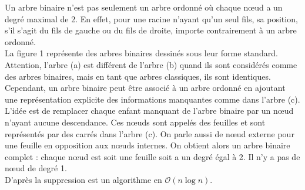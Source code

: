 \documentclass{report}
\begin{document}
Un arbre binaire n'est pas seulement un arbre ordonné où chaque nœud a un degré maximal de 2.  En effet, pour une racine n'ayant qu'un seul fils, sa position, s'il s'agit du fils de gauche ou du fils de droite, importe contrairement à un arbre ordonné.\\
La figure 1 représente des arbres binaires dessinés sous leur forme standard. Attention, l'arbre (a) est différent de l'arbre (b) quand ils sont considérés comme des arbres binaires, mais en tant que arbres classiques, ils sont identiques.\\
Cependant, un arbre binaire peut être associé à un arbre ordonné en ajoutant une représentation explicite des informations manquantes comme dans l'arbre (c). L'idée est de remplacer chaque enfant manquant de l'arbre binaire par un nœud n'ayant aucune descendance. Ces nœuds sont appelés des feuilles et sont représentés par des carrés dans l'arbre (c). On parle aussi de nœud externe pour une feuille en opposition aux nœuds internes. On obtient alors un arbre binaire complet : chaque nœud est soit une feuille soit a un degré égal à 2. Il n'y a pas de nœud de degré 1.\\


D'après \cite{Cormen:2009:IAT:1614191} la suppression est un algorithme en $\mathcal{O}(n \log{n})$.




\listoffigures
\end{document}
